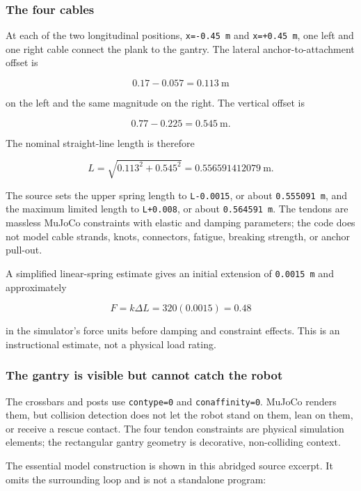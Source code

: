 \documentclass[
  american,
  11pt,
  letterpaper,
]{article}
\begin{document}
\subsubsection{The four cables}\label{the-four-cables}

At each of the two longitudinal positions, \texttt{x=-0.45\ m} and
\texttt{x=+0.45\ m}, one left and one right cable connect the plank to
the gantry. The lateral anchor-to-attachment offset is

\[
\!0.17-0.057=0.113\ \text{m}
\]

on the left and the same magnitude on the right. The vertical offset is

\[
0.77-0.225=0.545\ \text{m}.
\]

The nominal straight-line length is therefore

\[
L=\sqrt{0.113^2+0.545^2}
  =0.556591412079\ \text{m}.
\]

The source sets the upper spring length to \texttt{L-0.0015}, or about
\texttt{0.555091\ m}, and the maximum limited length to
\texttt{L+0.008}, or about \texttt{0.564591\ m}. The tendons are
massless MuJoCo constraints with elastic and damping parameters; the
code does not model cable strands, knots, connectors, fatigue, breaking
strength, or anchor pull-out.

A simplified linear-spring estimate gives an initial extension of
\texttt{0.0015\ m} and approximately

\[
F=k\Delta L=320(0.0015)=0.48
\]

in the simulator's force units before damping and constraint effects.
This is an instructional estimate, not a physical load rating.

\subsubsection{The gantry is visible but cannot catch the
robot}\label{the-gantry-is-visible-but-cannot-catch-the-robot}

The crossbars and posts use \texttt{contype=0} and
\texttt{conaffinity=0}. MuJoCo renders them, but collision detection
does not let the robot stand on them, lean on them, or receive a rescue
contact. The four tendon constraints are physical simulation elements;
the rectangular gantry geometry is decorative, non-colliding context.

The essential model construction is shown in this abridged source
excerpt. It omits the surrounding loop and is not a standalone program:
\end{document}
